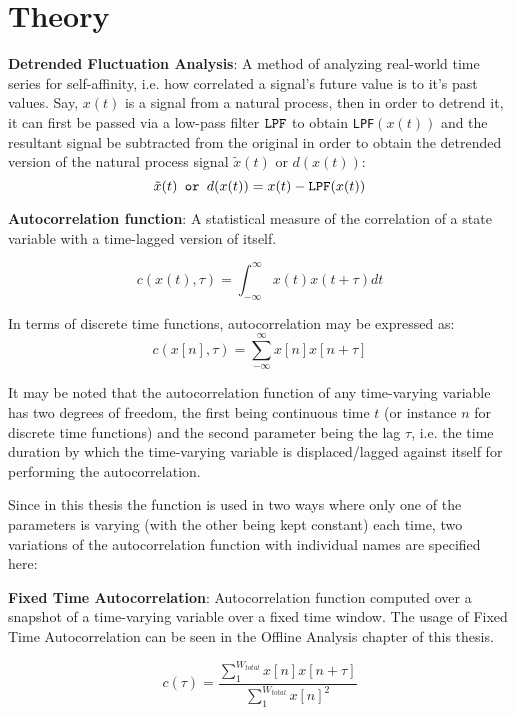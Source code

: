\section[Theory]{Theory}
\label{sec:theory}

\textbf{Detrended Fluctuation Analysis}: A method of analyzing real-world time series for self-affinity, i.e. how correlated a signal's future value is to it's past values. Say, $x(t)$ is a signal from a natural process, then in order to detrend it, it can first be passed via a low-pass filter $\verb|LPF|$ to obtain \verb|LPF|$(x(t))$ and the resultant signal be subtracted from the original in order to obtain the detrended version of the natural process signal $\tilde{x}(t)$ or $d(x(t))$:
\begin{equation}
	\tilde{x}(t) \verb| or | d(x(t)) = x(t) - \verb|LPF|(x(t))
\end{equation}

\textbf{Autocorrelation function}: A statistical measure of the correlation of a state variable with a time-lagged version of itself. 

\begin{equation}
	c(x(t), \tau) = \int_{-\infty}^{\infty}x(t)x(t+\tau)dt  
\end{equation}

In terms of discrete time functions, autocorrelation may be expressed as:
\begin{equation}
	c(x[n], \tau) =  \sum_{-\infty}^{\infty} x[n]x[n+\tau]
\end{equation}

It may be noted that the autocorrelation function of any time-varying variable has two degrees of freedom, the first being continuous time $t$ (or instance $n$ for discrete time functions) and the second parameter being the lag $\tau$, i.e. the time duration by which the time-varying variable is displaced/lagged against itself for performing the autocorrelation.

Since in this thesis the function is used in two ways where only one of the parameters is varying (with the other being kept constant) each time, two variations of the autocorrelation function with individual names are specified here:

\textbf{Fixed Time Autocorrelation}: Autocorrelation function computed over a snapshot of a time-varying variable over a fixed time window. The usage of Fixed Time Autocorrelation can be seen in the Offline Analysis chapter of this thesis.

\begin{equation}
	c(\tau) = \frac{\sum_{1}^{W_{total}} x[n]x[n+\tau]}{\sum_{1}^{W_{total}} x[n]^2} 
\end{equation}
 
